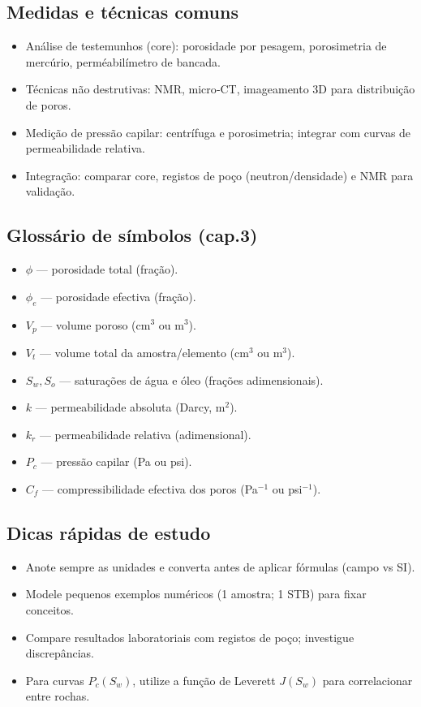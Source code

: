 \documentclass[11pt,a4paper]{article}
\begin{document}
\subsection{Medidas e técnicas comuns}
\begin{itemize}
\item Análise de testemunhos (core): porosidade por pesagem, porosimetria de mercúrio, perméabilímetro de bancada.
\item Técnicas não destrutivas: NMR, micro‑CT, imageamento 3D para distribuição de poros.
\item Medição de pressão capilar: centrífuga e porosimetria; integrar com curvas de permeabilidade relativa.
\item Integração: comparar core, registos de poço (neutron/densidade) e NMR para validação.
\end{itemize}

\subsection{Glossário de símbolos (cap.3)}
\begin{itemize}
\item $\phi$ — porosidade total (fração).
\item $\phi_e$ — porosidade efectiva (fração).
\item $V_p$ — volume poroso (cm$^3$ ou m$^3$).
\item $V_t$ — volume total da amostra/elemento (cm$^3$ ou m$^3$).
\item $S_w, S_o$ — saturações de água e óleo (frações adimensionais).
\item $k$ — permeabilidade absoluta (Darcy, m$^2$).
\item $k_r$ — permeabilidade relativa (adimensional).
\item $P_c$ — pressão capilar (Pa ou psi).
\item $C_f$ — compressibilidade efectiva dos poros (Pa$^{-1}$ ou psi$^{-1}$).
\end{itemize}

\subsection{Dicas rápidas de estudo}
\begin{itemize}
\item Anote sempre as unidades e converta antes de aplicar fórmulas (campo vs SI).
\item Modele pequenos exemplos numéricos (1 amostra; 1 STB) para fixar conceitos.
\item Compare resultados laboratoriais com registos de poço; investigue discrepâncias.
\item Para curvas $P_c(S_w)$, utilize a função de Leverett $J(S_w)$ para correlacionar entre rochas.
\end{itemize}
\end{document}
